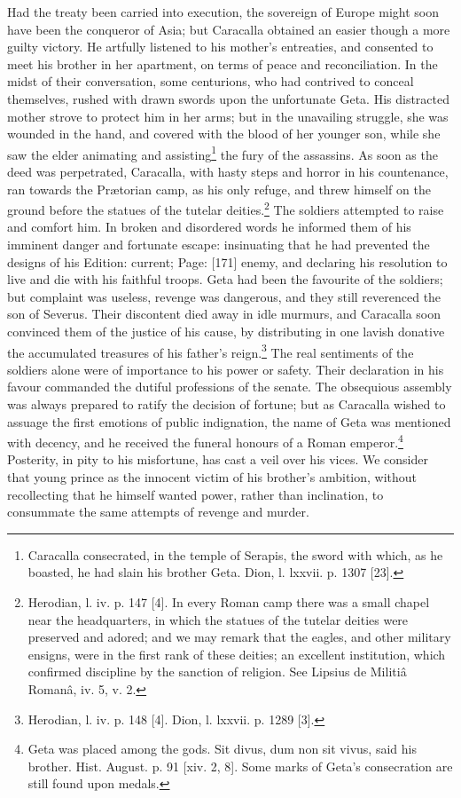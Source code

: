 Had the treaty been carried into execution, the sovereign of Europe might soon have been the conqueror of Asia; but Caracalla obtained an easier though a more guilty victory. He artfully listened to his mother\texthebrew{}’s entreaties, and consented to meet his brother in her apartment, on terms of peace and reconciliation. In the midst of their conversation, some centurions, who had contrived to conceal themselves, rushed with drawn swords upon the unfortunate Geta. His distracted mother strove to protect him in her arms; but in the unavailing struggle, she was wounded in the hand, and covered with the blood of her younger son, while she saw the elder animating and assisting\footnote{Caracalla consecrated, in the temple of Serapis, the sword with which, as he boasted, he had slain his brother Geta. Dion, l. lxxvii. p. 1307 [23].} the fury of the assassins. As soon as the deed was perpetrated, Caracalla, with hasty steps and horror in his countenance, ran towards the Prætorian camp, as his only refuge, and threw himself on the ground before the statues of the tutelar deities.\footnote{Herodian, l. iv. p. 147 [4]. In every Roman camp there was a small chapel near the headquarters, in which the statues of the tutelar deities were preserved and adored; and we may remark that the eagles, and other military ensigns, were in the first rank of these deities; an excellent institution, which confirmed discipline by the sanction of religion. See Lipsius de Militiâ Romanâ, iv. 5, v. 2.} The soldiers attempted to raise and comfort him. In broken and disordered words he informed them of his imminent danger and fortunate escape: insinuating that he had prevented the designs of his Edition: current; Page: [171] enemy, and declaring his resolution to live and die with his faithful troops. Geta had been the favourite of the soldiers; but complaint was useless, revenge was dangerous, and they still reverenced the son of Severus. Their discontent died away in idle murmurs, and Caracalla soon convinced them of the justice of his cause, by distributing in one lavish donative the accumulated treasures of his father\texthebrew{}’s reign.\footnote{Herodian, l. iv. p. 148 [4]. Dion, l. lxxvii. p. 1289 [3].} The real sentiments of the soldiers alone were of importance to his power or safety. Their declaration in his favour commanded the dutiful professions of the senate. The obsequious assembly was always prepared to ratify the decision of fortune; but as Caracalla wished to assuage the first emotions of public indignation, the name of Geta was mentioned with decency, and he received the funeral honours of a Roman emperor.\footnote{Geta was placed among the gods. Sit divus, dum non sit vivus, said his brother. Hist. August. p. 91 [xiv. 2, 8]. Some marks of Geta\texthebrew{}’s consecration are still found upon medals.} Posterity, in pity to his misfortune, has cast a veil over his vices. We consider that young prince as the innocent victim of his brother\texthebrew{}’s ambition, without recollecting that he himself wanted power, rather than inclination, to consummate the same attempts of revenge and murder.

